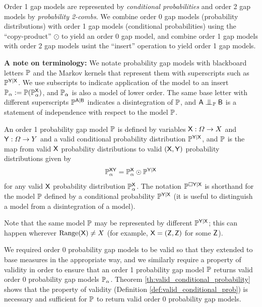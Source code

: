 Order 1 gap models are represented by \emph{conditional probabilities} and order 2 gap models by \emph{probability 2-combs}. We combine order 0 gap models (probability distributions) with order 1 gap models (conditional probabilities) using the ``copy-product'' $\odot$ to yield an order 0 gap model, and combine order 1 gap models with order 2 gap models usint the ``insert'' operation to yield order 1 gap models.

\textbf{A note on terminology:} We notate probability gap models with blackboard letters $\mathbb{P}$ and the Markov kernels that represent them with superscripts such as $\mathbb{P}^{\mathsf{Y}|\mathsf{X}}$. We use subscripts to indicate application of the model to an insert $\mathbb{P}_\alpha:=\mathbb{P}(\mathbb{P}^{\mathsf{X}}_\alpha)$, and $\mathbb{P}_\alpha$ is also a model of lower order. The same base letter with different superscripts $\mathbb{P}^{\mathsf{A}|\mathsf{B}}$ indicates a disintegration of $\mathbb{P}$, and $\RV{A}\CI_{\prob{P}} \RV{B}$ is a statement of independence with respect to the model $\mathbb{P}$.

\begin{definition}
An order 1 probability gap model $\mathbb{P}$ is defined by variables $\mathsf{X}:\Omega\to X$ and $\mathsf{Y}:\Omega\to Y$ and a valid conditional probability distribution $\mathbb{P}^{\mathsf{Y}|\mathsf{X}}$, and $\mathbb{P}$ is the map from valid $\mathsf{X}$ probability distributions to valid $(\mathsf{X},\mathsf{Y})$ probability distributions given by
\begin{align}
	\mathbb{P}_{\alpha}^{\mathsf{XY}} = \mathbb{P}_\alpha^{\mathsf{X}}\odot\mathbb{P}^{\mathsf{Y}|\mathsf{X}}
\end{align}
for any valid $\mathsf{X}$ probability distribution $\mathbb{P}_\alpha^{\mathsf{X}}$. The notation $\mathbb{P}^{\square \mathsf{Y}|\mathsf{X}}$ is shorthand for the model $\mathbb{P}$ defined by a conditional probability $\mathbb{P}^{\mathsf{Y}|\mathsf{X}}$ (it is useful to distinguish a model from a disintegration of a model).
\end{definition}

Note that the same model $\mathbb{P}$ may be represented by different $\mathbb{P}^{\mathsf{Y}|\mathsf{X}}$; this can happen wherever $\text{Range}(\mathsf{X})\neq X$ (for example, $\mathsf{X}=(\mathsf{Z},\mathsf{Z})$ for some $\mathsf{Z}$). 

We required order 0 probability gap models to be valid so that they extended to base measures in the appropriate way, and we similarly require a property of validity in order to ensure that an order 1 probability gap model $\mathbb{P}$ returns valid order 0 probability gap models $\mathbb{P}_\alpha$. Theorem \ref{th:valid_conditional_probability} shows that the property of validity (Definition \ref{def:valid_conditional_prob}) is necessary and sufficient for $\mathbb{P}$ to return valid order 0 probability gap models.

